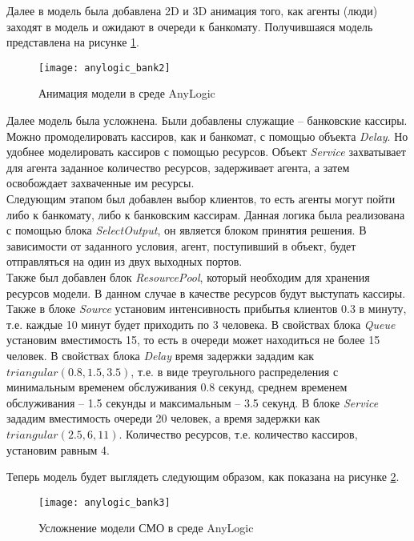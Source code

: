 Далее в модель была добавлена 2D и 3D анимация того, как агенты (люди) заходят в модель и ожидают в очереди к банкомату. Получившаяся модель представлена на рисунке \ref{fig:anylogic_bank2}.\\
\begin{figure}[h]
	\centering \texttt{[image: anylogic\_bank2]}
	\caption{Анимация модели в среде AnyLogic}
	\label{fig:anylogic_bank2}
\end{figure}

\newpage

Далее модель была усложнена. Были добавлены служащие -- банковские кассиры. Можно промоделировать кассиров, как и банкомат, с помощью объекта \textit{Delay}. Но удобнее моделировать кассиров с помощью ресурсов. Объект \textit{Service} захватывает для агента заданное количество ресурсов, задерживает агента, а затем освобождает захваченные им ресурсы.\\

Следующим этапом был добавлен выбор клиентов, то есть агенты могут пойти либо к банкомату, либо к банковским кассирам. Данная логика была реализована с помощью блока \textit{SelectOutput}, он является блоком принятия решения. В зависимости от заданного условия, агент, поступивший в объект, будет отправляться на один из двух выходных портов.\\

Также был добавлен блок \textit{ResourcePool}, который необходим для хранения ресурсов модели. В данном случае в качестве ресурсов будут выступать кассиры.\\


Также в блоке \textit{Source} установим интенсивность прибытья клиентов 0.3 в минуту, т.е. каждые 10 минут будет приходить по 3 человека. В свойствах блока \textit{Queue} установим вместимость 15, то есть в очереди может находиться не более 15 человек. В свойствах блока \textit{Delay} время задержки зададим как $triangular(0.8, 1.5, 3.5)$, т.е. в виде треугольного распределения с минимальным временем обслуживания 0.8 секунд, среднем временем обслуживания -- 1.5 секунды и максимальным -- 3.5 секунд. В блоке \textit{Service} зададим вместимость очереди 20 человек, а время задержки как $triangular(2.5, 6, 11)$. Количество ресурсов, т.е. количество кассиров, установим равным 4.

Теперь модель будет выглядеть следующим образом, как показана на рисунке \ref{fig:anylogic_bank3}.\\
\begin{figure}[h]
	\centering \texttt{[image: anylogic\_bank3]}
	\caption{Усложнение модели СМО в среде AnyLogic}
	\label{fig:anylogic_bank3}
\end{figure}

